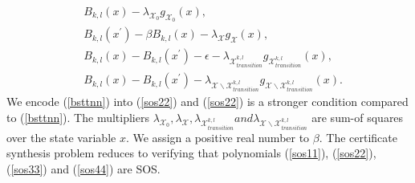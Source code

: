 \documentclass[acmlarge]{acmart}
\begin{document}
\begin{align}
  &B_{k, l}(x) - \lambda_{\mathcal{X}_0} g_{\mathcal{X}_0}(x), \label{sos11} \\
  &B_{k, l}(x^{\prime}) - \beta B_{k, l}(x) - \lambda_{\mathcal{X}} g_{\mathcal{X}}(x), \label{sos22} \\
  &B_{k, l}(x) - B_{k, l}(x^{\prime}) - \epsilon - \lambda_{\mathcal{X}_{transition}^{k, l}} g_{\mathcal{X}_{transition}^{k, l}}(x), \label{sos33} \\
  &B_{k, l}(x) -  B_{k, l}(x^{\prime}) - \lambda_{\mathcal{X} \backslash \mathcal{X}_{transition}^{k, l}} g_{\mathcal{X} \backslash \mathcal{X}_{transition}^{k, l}}(x). \label{sos44}
\end{align}
We encode (\ref{bsttnn}) into (\ref{sos22}) and (\ref{sos22}) is a stronger condition compared to (\ref{bsttnn}). The multipliers $\lambda_{\mathcal{X}_0}, \lambda_{\mathcal{X}}, \lambda_{\mathcal{X}_{transition}^{k, l}} and \lambda_{\mathcal{X} \backslash \mathcal{X}_{transition}^{k, l}}$ are sum-of squares over the state variable $x$.  We assign a positive real number to $\beta$. The certificate synthesis problem reduces to verifying that polynomials (\ref{sos11}), (\ref{sos22}), (\ref{sos33}) and (\ref{sos44}) are SOS.
\end{document}
